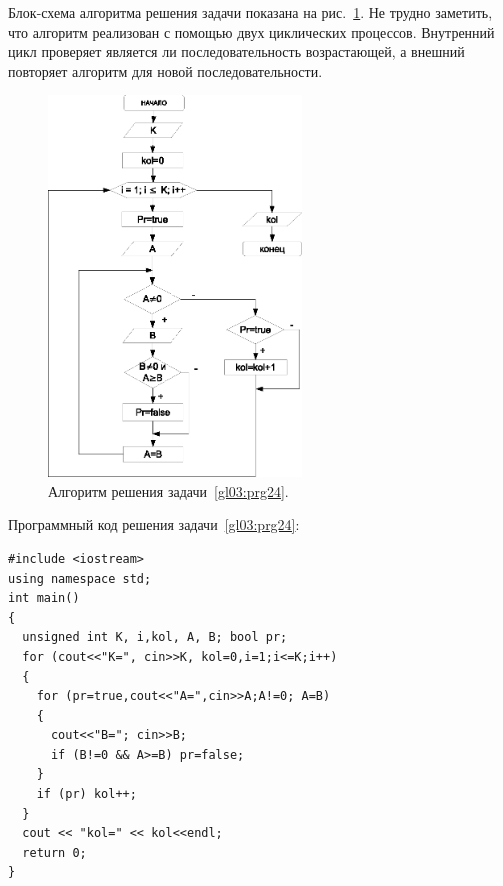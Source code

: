 
Блок-схема алгоритма решения задачи показана на рис.~\ref{ch03:refDrawing37}. Не трудно заметить, что алгоритм реализован с
помощью двух циклических процессов. Внутренний цикл проверяет является ли последовательность возрастающей, а внешний
повторяет алгоритм для новой последовательности.

\begin{figure}[htb]
\begin{center}
\includegraphics[width=0.6\textwidth]{img/ris_3_38}
\caption{Алгоритм решения задачи~\ref{gl03:prg24}.}
\label{ch03:refDrawing37}
\end{center}
\end{figure}

Программный код решения задачи~\ref{gl03:prg24}:
\begin{lstlisting}
#include <iostream>
using namespace std;
int main()
{
  unsigned int K, i,kol, A, B; bool pr;
  for (cout<<"K=", cin>>K, kol=0,i=1;i<=K;i++)
  {
    for (pr=true,cout<<"A=",cin>>A;A!=0; A=B)
    {
      cout<<"B="; cin>>B;
      if (B!=0 && A>=B) pr=false;
    }
    if (pr) kol++;
  }
  cout << "kol=" << kol<<endl;
  return 0;
}
\end{lstlisting}


